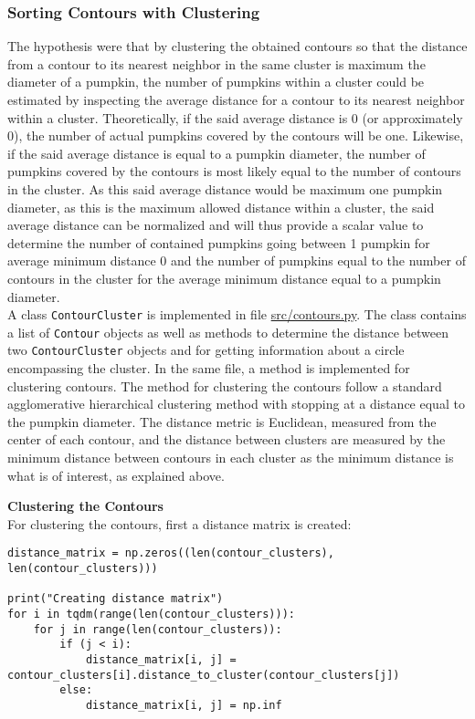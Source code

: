 \documentclass[../Head/Main.tex]{subfiles}
\begin{document}
\subsubsection{Sorting Contours with Clustering}
The hypothesis were that by clustering the obtained contours so that the distance from a contour to its nearest neighbor in the same cluster is maximum the diameter of a pumpkin, the number of pumpkins within a cluster could be estimated by inspecting the average distance for a contour to its nearest neighbor within a cluster. Theoretically, if the said average distance is 0 (or approximately 0), the number of actual pumpkins covered by the contours will be one. Likewise, if the said average distance is equal to a pumpkin diameter, the number of pumpkins covered by the contours is most likely equal to the number of contours in the cluster. As this said average distance would be maximum one pumpkin diameter, as this is the maximum allowed distance within a cluster, the said average distance can be normalized and will thus provide a scalar value to determine the number of contained pumpkins going between 1 pumpkin for average minimum distance 0 and the number of pumpkins equal to the number of contours in the cluster for the average minimum distance equal to a pumpkin diameter.\\
A class \verb+ContourCluster+ is implemented in file \url{src/contours.py}. The class contains a list of \verb+Contour+ objects as well as methods to determine the distance between two \verb+ContourCluster+ objects and for getting information about a circle encompassing the cluster. In the same file, a method is implemented for clustering contours. The method for clustering the contours follow a standard agglomerative hierarchical clustering method with stopping at a distance equal to the pumpkin diameter. The distance metric is Euclidean, measured from the center of each contour, and the distance between clusters are measured by the minimum distance between contours in each cluster as the minimum distance is what is of interest, as explained above.\par
\textbf{Clustering the Contours}\\
For clustering the contours, first a distance matrix is created:
\begin{verbatim}
distance_matrix = np.zeros((len(contour_clusters), len(contour_clusters)))

print("Creating distance matrix")
for i in tqdm(range(len(contour_clusters))):
    for j in range(len(contour_clusters)):
        if (j < i):
            distance_matrix[i, j] = contour_clusters[i].distance_to_cluster(contour_clusters[j])
        else:
            distance_matrix[i, j] = np.inf
\end{verbatim}
\end{document}
